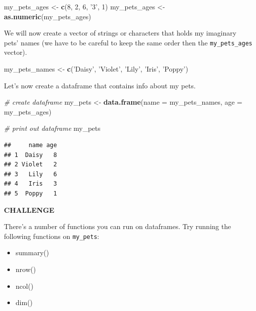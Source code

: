 \documentclass[
]{book}
\newenvironment{Shaded}{\begin{snugshade}}{\end{snugshade}}
\newcommand{\CommentTok}[1]{\textcolor[rgb]{0.56,0.35,0.01}{\textit{#1}}}
\newcommand{\DataTypeTok}[1]{\textcolor[rgb]{0.13,0.29,0.53}{#1}}
\newcommand{\DecValTok}[1]{\textcolor[rgb]{0.00,0.00,0.81}{#1}}
\newcommand{\KeywordTok}[1]{\textcolor[rgb]{0.13,0.29,0.53}{\textbf{#1}}}
\newcommand{\NormalTok}[1]{#1}
\newcommand{\StringTok}[1]{\textcolor[rgb]{0.31,0.60,0.02}{#1}}
\begin{document}
\begin{Shaded}
\begin{Highlighting}[]
\NormalTok{my_pets_ages <-}\StringTok{ }\KeywordTok{c}\NormalTok{(}\DecValTok{8}\NormalTok{, }\DecValTok{2}\NormalTok{, }\DecValTok{6}\NormalTok{, }\StringTok{'3'}\NormalTok{, }\DecValTok{1}\NormalTok{)}
\NormalTok{my_pets_ages <-}\StringTok{ }\KeywordTok{as.numeric}\NormalTok{(my_pets_ages)}
\end{Highlighting}
\end{Shaded}

We will now create a vector of strings or characters that holds my imaginary pets' names (we have to be careful to keep the same order then the \texttt{my\_pets\_ages} vector).

\begin{Shaded}
\begin{Highlighting}[]
\NormalTok{my_pets_names <-}\StringTok{ }\KeywordTok{c}\NormalTok{(}\StringTok{'Daisy'}\NormalTok{, }\StringTok{'Violet'}\NormalTok{, }\StringTok{'Lily'}\NormalTok{, }\StringTok{'Iris'}\NormalTok{, }\StringTok{'Poppy'}\NormalTok{)}
\end{Highlighting}
\end{Shaded}

Let's now create a dataframe that contains info about my pets.

\begin{Shaded}
\begin{Highlighting}[]
\CommentTok{# create dataframe}
\NormalTok{my_pets <-}\StringTok{ }\KeywordTok{data.frame}\NormalTok{(}\DataTypeTok{name =}\NormalTok{ my_pets_names, }\DataTypeTok{age =}\NormalTok{ my_pets_ages)}

\CommentTok{# print out dataframe}
\NormalTok{my_pets}
\end{Highlighting}
\end{Shaded}

\begin{verbatim}
##     name age
## 1  Daisy   8
## 2 Violet   2
## 3   Lily   6
## 4   Iris   3
## 5  Poppy   1
\end{verbatim}

\textbf{CHALLENGE}

There's a number of functions you can run on dataframes. Try running the following functions on \texttt{my\_pets}:

\begin{itemize}
\item
  summary()
\item
  nrow()
\item
  ncol()
\item
  dim()
\end{itemize}
\end{document}
